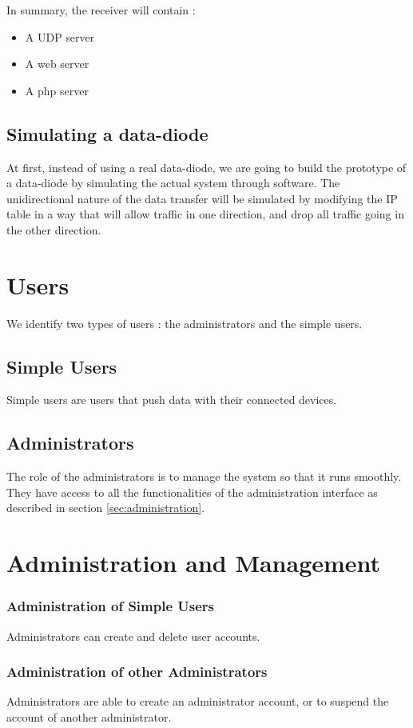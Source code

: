 \documentclass[a4paper,11pt]{article}
\begin{document}
In summary, the receiver will contain :
\begin{itemize}
\item{A UDP server}
\item{A web server}
\item{A php server}
\end{itemize}

\subsection{Simulating a data-diode}
At first, instead of using a real data-diode, we are going to build the prototype of a data-diode by simulating the actual system through software. The unidirectional nature of the data transfer will be simulated by modifying the IP table in a way that will allow traffic in one direction, and drop all traffic going in the other direction.


\section{Users}
We identify two types of users : the administrators and the simple users.

\subsection{Simple Users}
Simple users are users that push data with their connected devices.

\subsection{Administrators}
The role of the administrators is to manage the system so that it runs smoothly. They have access to all the functionalities of the administration interface as described in section \ref{sec:administration}.

\section{Administration and Management}

\subsubsection{Administration of Simple Users}
Administrators can create and delete user accounts.

\subsubsection{Administration of other Administrators}
Administrators are able to create an administrator account, or to suspend the account of another administrator.
\end{document}
